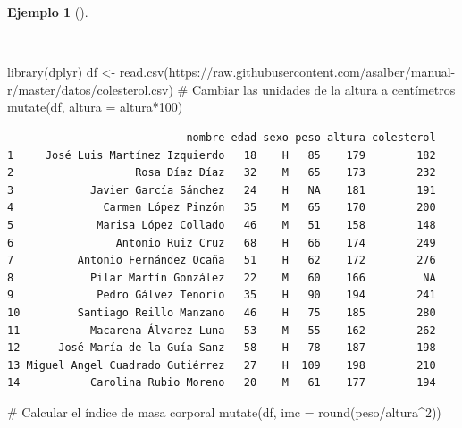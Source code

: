 \documentclass[
  spanish,
  a4paper,
]{scrreport}
\newenvironment{Shaded}{\begin{snugshade}}{\end{snugshade}}
\newcommand{\AttributeTok}[1]{\textcolor[rgb]{0.40,0.45,0.13}{#1}}
\newcommand{\CommentTok}[1]{\textcolor[rgb]{0.37,0.37,0.37}{#1}}
\newcommand{\DecValTok}[1]{\textcolor[rgb]{0.68,0.00,0.00}{#1}}
\newcommand{\FunctionTok}[1]{\textcolor[rgb]{0.28,0.35,0.67}{#1}}
\newcommand{\NormalTok}[1]{\textcolor[rgb]{0.00,0.23,0.31}{#1}}
\newcommand{\OtherTok}[1]{\textcolor[rgb]{0.00,0.23,0.31}{#1}}
\newcommand{\SpecialCharTok}[1]{\textcolor[rgb]{0.37,0.37,0.37}{#1}}
\newcommand{\StringTok}[1]{\textcolor[rgb]{0.13,0.47,0.30}{#1}}
\theoremstyle{definition}
\theoremstyle{definition}
\newtheorem{example}{Ejemplo}[chapter]
\theoremstyle{remark}
\begin{document}
\begin{example}[]\protect\hypertarget{exm-mutate}{}\label{exm-mutate}

~

\begin{Shaded}
\begin{Highlighting}[]
\FunctionTok{library}\NormalTok{(dplyr)}
\NormalTok{df }\OtherTok{\textless{}{-}} \FunctionTok{read.csv}\NormalTok{(}\StringTok{\textquotesingle{}https://raw.githubusercontent.com/asalber/manual{-}r/master/datos/colesterol.csv\textquotesingle{}}\NormalTok{)}
\CommentTok{\# Cambiar las unidades de la altura a centímetros}
\FunctionTok{mutate}\NormalTok{(df, }\AttributeTok{altura =}\NormalTok{ altura}\SpecialCharTok{*}\DecValTok{100}\NormalTok{)}
\end{Highlighting}
\end{Shaded}

\begin{verbatim}
                            nombre edad sexo peso altura colesterol
1     José Luis Martínez Izquierdo   18    H   85    179        182
2                   Rosa Díaz Díaz   32    M   65    173        232
3            Javier García Sánchez   24    H   NA    181        191
4              Carmen López Pinzón   35    M   65    170        200
5             Marisa López Collado   46    M   51    158        148
6                Antonio Ruiz Cruz   68    H   66    174        249
7          Antonio Fernández Ocaña   51    H   62    172        276
8            Pilar Martín González   22    M   60    166         NA
9             Pedro Gálvez Tenorio   35    H   90    194        241
10         Santiago Reillo Manzano   46    H   75    185        280
11           Macarena Álvarez Luna   53    M   55    162        262
12      José María de la Guía Sanz   58    H   78    187        198
13 Miguel Angel Cuadrado Gutiérrez   27    H  109    198        210
14           Carolina Rubio Moreno   20    M   61    177        194
\end{verbatim}

\begin{Shaded}
\begin{Highlighting}[]
\CommentTok{\# Calcular el índice de masa corporal}
\FunctionTok{mutate}\NormalTok{(df, }\AttributeTok{imc =} \FunctionTok{round}\NormalTok{(peso}\SpecialCharTok{/}\NormalTok{altura}\SpecialCharTok{\^{}}\DecValTok{2}\NormalTok{))}
\end{Highlighting}
\end{Shaded}


\end{example}
\end{document}
